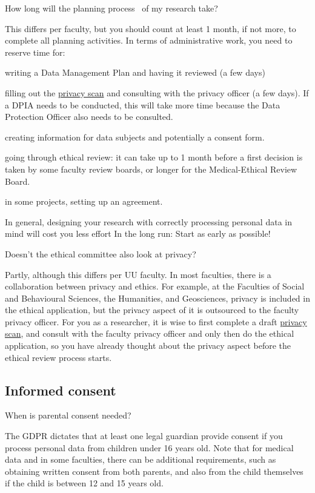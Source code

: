 \documentclass[
]{book}
\begin{document}
How long will the planning process ~of my research take?

This differs per faculty, but you should count at least 1 month, if not more, to complete all planning activities. In terms of administrative work, you need to reserve time for:

writing a Data Management Plan and having it reviewed (a few days)

filling out the \protect\hyperlink{privacy-scan}{privacy scan} and consulting with the privacy officer (a few days). If a DPIA needs to be conducted, this will take more time because the Data Protection Officer also needs to be consulted.

creating information for data subjects and potentially a consent form.

going through ethical review: it can take up to 1 month before a first decision is taken by some faculty review boards, or longer for the Medical-Ethical Review Board.

in some projects, setting up an agreement.

In general, designing your research with correctly processing personal data in mind will cost you less effort In the long run: Start as early as possible!

Doesn't the ethical committee also look at privacy?

Partly, although this differs per UU faculty. In most faculties, there is a collaboration between privacy and ethics. For example, at the Faculties of Social and Behavioural Sciences, the Humanities, and Geosciences, privacy is included in the ethical application, but the privacy aspect of it is outsourced to the faculty privacy officer. For you as a researcher, it is wise to first complete a draft \protect\hyperlink{privacy-scan}{privacy scan}, and consult with the faculty privacy officer and only then do the ethical application, so you have already thought about the privacy aspect before the ethical review process starts.

\hypertarget{consent}{%
\subsection{Informed consent}\label{consent}}

When is parental consent needed?

The GDPR dictates that at least one legal guardian provide consent if you process personal data from children under 16 years old. Note that for medical data and in some faculties, there can be additional requirements, such as obtaining written consent from both parents, and also from the child themselves if the child is between 12 and 15 years old.
\end{document}
